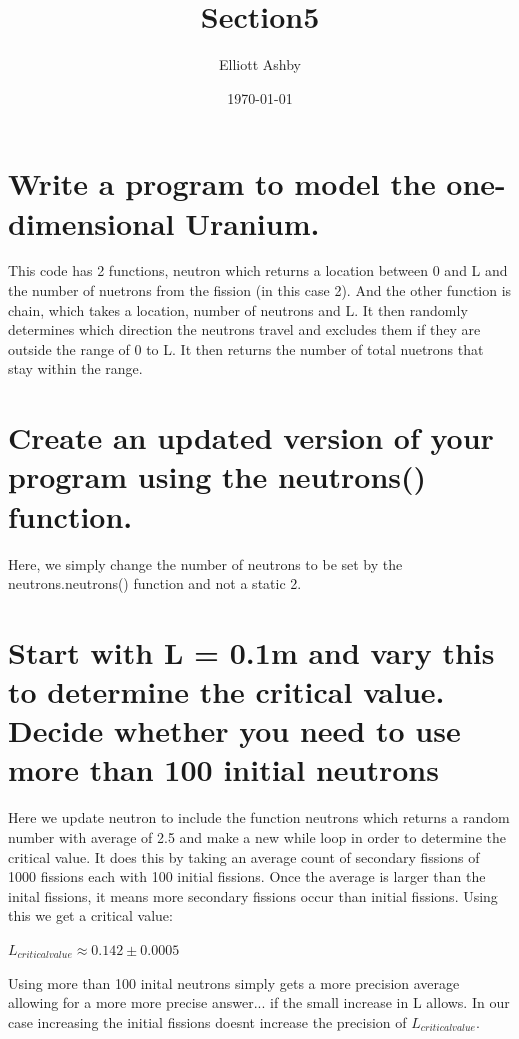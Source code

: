 \documentclass[a4paper,english]{article}
\title{Section5}
\author{Elliott Ashby}
\date{\today}
\begin{document}
    \maketitle
    \section{Write a program to model the one-dimensional Uranium.}
    
    This code has 2 functions, neutron which returns a location between 0 and L and the number of nuetrons from the fission
    (in this case 2). And the other function is chain, which takes a location, number of neutrons and L. It then randomly 
    determines which direction the neutrons travel and excludes them if they are outside the range of 0 to L. It then
    returns the number of total nuetrons that stay within the range.
    \\
    \section{Create an updated version of your program using the neutrons() function.}
    
    Here, we simply change the number of neutrons to be set by the neutrons.neutrons() function and not a static 2.
    \section{Start with L = 0.1m and vary this to determine the critical value. Decide
whether you need to use more than 100 initial neutrons}
    
    Here we update neutron to include the function neutrons which returns a random number with average of 2.5 and make 
    a new while loop in order to determine the critical value. It does this by taking an average count of secondary fissions
    of 1000 fissions each with 100 initial fissions. Once the average is larger than the inital fissions, it means more 
    secondary fissions occur than initial fissions.
    Using this we get a critical value:
    \begin{center}
        $L_{critical value} \approx 0.142 \pm 0.0005$
    \end{center}
    Using more than 100 inital neutrons simply gets a more precision average allowing for a more more precise answer...
    if the small increase in L allows. In our case increasing the initial fissions doesnt increase the precision of
    $L_{critical value}$.
\end{document}

